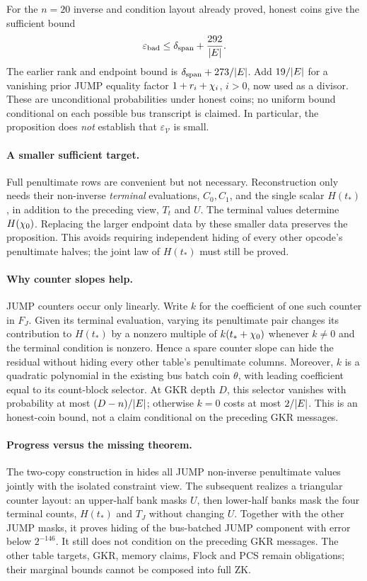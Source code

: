 For the $n=20$ inverse and condition layout already proved, honest coins give the sufficient bound
\[
 \varepsilon_{\mathrm{bad}}
 \le \delta_{\mathrm{span}}+\frac{292}{|E|}.
\]
The earlier rank and endpoint bound is $\delta_{\mathrm{span}}+273/|E|$. Add $19/|E|$ for a vanishing prior JUMP equality factor $1+r_i+\chi_i$, $i>0$, now used as a divisor. These are unconditional probabilities under honest coins; no uniform bound conditional on each possible bus transcript is claimed. In particular, the proposition does \emph{not} establish that $\varepsilon_{\mathcal V}$ is small.

\paragraph{A smaller sufficient target.} Full penultimate rows are convenient but not necessary. Reconstruction only needs their non-inverse \emph{terminal} evaluations, $C_0,C_1$, and the single scalar $H(t_*)$, in addition to the preceding view, $T_t$ and $U$. The terminal values determine $H(\chi_0)$. Replacing the larger endpoint data by these smaller data preserves the proposition. This avoids requiring independent hiding of every other opcode's penultimate halves; the joint law of $H(t_*)$ must still be proved.

\paragraph{Why counter slopes help.} JUMP counters occur only linearly. Write $k$ for the coefficient of one such counter in $F_J$. Given its terminal evaluation, varying its penultimate pair changes its contribution to $H(t_*)$ by a nonzero multiple of $k(t_*+\chi_0)$ whenever $k\ne0$ and the terminal condition is nonzero. Hence a spare counter slope can hide the residual without hiding every other table's penultimate columns. Moreover, $k$ is a quadratic polynomial in the existing bus batch coin $\theta$, with leading coefficient equal to its count-block selector. At GKR depth $D$, this selector vanishes with probability at most $(D-n)/|E|$; otherwise $k=0$ costs at most $2/|E|$. This is an honest-coin bound, not a claim conditional on the preceding GKR messages.

\paragraph{Progress versus the missing theorem.} The two-copy construction in  hides all JUMP non-inverse penultimate values jointly with the isolated constraint view. The subsequent  realizes a triangular counter layout: an upper-half bank masks $U$, then lower-half banks mask the four terminal counts, $H(t_*)$ and $T_J$ without changing $U$. Together with the other JUMP masks, it proves hiding of the bus-batched JUMP component with error below $2^{-146}$. It still does not condition on the preceding GKR messages. The other table targets, GKR, memory claims, Flock and PCS remain obligations; their marginal bounds cannot be composed into full ZK.

